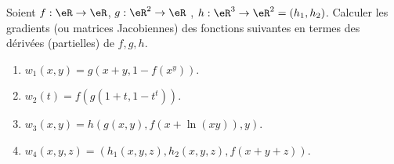 
\begin{exercice}\label{exo0057}

Soient $f:\eR \rightarrow  \eR$, $g:\eR^2\rightarrow \eR$ , $h:\eR^3\rightarrow  \eR^2 =  (h_1, h_2)$. Calculer les gradients (ou matrices Jacobiennes) des fonctions suivantes en termes des dérivées (partielles) de $f,g,h$.
\begin{enumerate}
\item $w_1(x,y)=g(x+y, 1-f(x^y))$. 
\item $w_2(t)=f(g(1+t, 1-t^t))$.
\item $w_3(x,y)=h(g(x,y), f(x+\ln(xy)), y)$.
\item $ w_4(x,y,z)=(h_1(x,y,z), h_2(x,y,z), f(x+y+z))$.
\end{enumerate}


\end{exercice}
